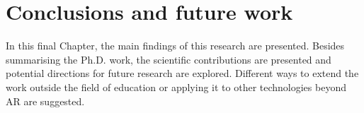 





\ifpdf
    \graphicspath{{Content/figures/PNG/}{Content/figures/JPG/}{Content/figures/PDF/}{Content/figures/}}
\else
    \graphicspath{{Content/figures/EPS/}{Content/figures/}}
\fi

\chapter{Conclusions and future work}
\label{chap:conclusions}

In this final Chapter, the main findings of this research are presented. Besides summarising the Ph.D. work, the scientific contributions are presented and potential directions for future research are explored. Different ways to extend the work outside the field of education or applying it to other technologies beyond AR are suggested.

